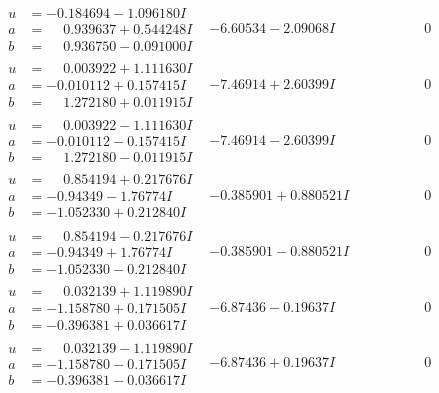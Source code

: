 \documentclass[1p]{elsarticle_modified}
\theoremstyle{definition}
\begin{document}
$$\begin{array}{c|c|c}
\begin{aligned}
u &= -0.184694 - 1.096180 I \\
a &= \phantom{-}0.939637 + 0.544248 I \\
b &= \phantom{-}0.936750 - 0.091000 I\end{aligned}
 & -6.60534 - 2.09068 I & \phantom{-0.000000 } 0 \\ \hline\begin{aligned}
u &= \phantom{-}0.003922 + 1.111630 I \\
a &= -0.010112 + 0.157415 I \\
b &= \phantom{-}1.272180 + 0.011915 I\end{aligned}
 & -7.46914 + 2.60399 I & \phantom{-0.000000 } 0 \\ \hline\begin{aligned}
u &= \phantom{-}0.003922 - 1.111630 I \\
a &= -0.010112 - 0.157415 I \\
b &= \phantom{-}1.272180 - 0.011915 I\end{aligned}
 & -7.46914 - 2.60399 I & \phantom{-0.000000 } 0 \\ \hline\begin{aligned}
u &= \phantom{-}0.854194 + 0.217676 I \\
a &= -0.94349 - 1.76774 I \\
b &= -1.052330 + 0.212840 I\end{aligned}
 & -0.385901 + 0.880521 I & \phantom{-0.000000 } 0 \\ \hline\begin{aligned}
u &= \phantom{-}0.854194 - 0.217676 I \\
a &= -0.94349 + 1.76774 I \\
b &= -1.052330 - 0.212840 I\end{aligned}
 & -0.385901 - 0.880521 I & \phantom{-0.000000 } 0 \\ \hline\begin{aligned}
u &= \phantom{-}0.032139 + 1.119890 I \\
a &= -1.158780 + 0.171505 I \\
b &= -0.396381 + 0.036617 I\end{aligned}
 & -6.87436 - 0.19637 I & \phantom{-0.000000 } 0 \\ \hline\begin{aligned}
u &= \phantom{-}0.032139 - 1.119890 I \\
a &= -1.158780 - 0.171505 I \\
b &= -0.396381 - 0.036617 I\end{aligned}
 & -6.87436 + 0.19637 I & \phantom{-0.000000 } 0 \\ \hline\begin{aligned}

\end{aligned}
\end{array}$$
\end{document}
